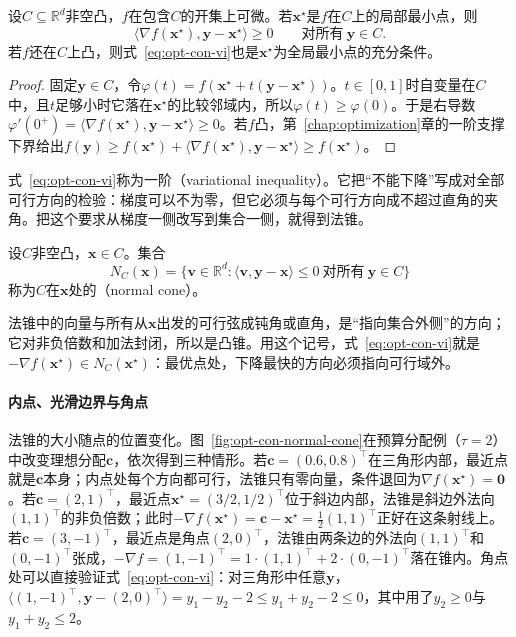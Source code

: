\begin{theorem}[凸可行域上的一阶条件]
\label{thm:opt-con-variational-inequality}
设$C\subseteq\mathbb R^d$非空凸，$f$在包含$C$的开集上可微。若$\bm x^\star$是$f$在$C$上的局部最小点，则
\begin{equation}
\label{eq:opt-con-vi}
  \langle\nabla f(\bm x^\star),\bm y-\bm x^\star\rangle\geq0\qquad\text{对所有}\ \bm y\in C.
\end{equation}
若$f$还在$C$上凸，则式~\eqref{eq:opt-con-vi}也是$\bm x^\star$为全局最小点的充分条件。
\end{theorem}

\begin{proof}
固定$\bm y\in C$，令$\varphi(t)=f(\bm x^\star+t(\bm y-\bm x^\star))$。$t\in[0,1]$时自变量在$C$中，且$t$足够小时它落在$\bm x^\star$的比较邻域内，所以$\varphi(t)\geq\varphi(0)$。于是右导数$\varphi'(0^+)=\langle\nabla f(\bm x^\star),\bm y-\bm x^\star\rangle\geq0$。若$f$凸，第~\ref{chap:optimization}章的一阶支撑下界给出$f(\bm y)\geq f(\bm x^\star)+\langle\nabla f(\bm x^\star),\bm y-\bm x^\star\rangle\geq f(\bm x^\star)$。
\end{proof}

式~\eqref{eq:opt-con-vi}称为一阶（variational inequality）。它把“不能下降”写成对全部可行方向的检验：梯度可以不为零，但它必须与每个可行方向成不超过直角的夹角。把这个要求从梯度一侧改写到集合一侧，就得到法锥。

\begin{definition}[法锥]
\label{def:opt-con-normal-cone}
设$C$非空凸，$\bm x\in C$。集合
\[
  N_C(\bm x)=\{\bm v\in\mathbb R^d:\langle\bm v,\bm y-\bm x\rangle\leq0\ \text{对所有}\ \bm y\in C\}
\]
称为$C$在$\bm x$处的（normal cone）。
\end{definition}

法锥中的向量与所有从$\bm x$出发的可行弦成钝角或直角，是“指向集合外侧”的方向；它对非负倍数和加法封闭，所以是凸锥。用这个记号，式~\eqref{eq:opt-con-vi}就是$-\nabla f(\bm x^\star)\in N_C(\bm x^\star)$：最优点处，下降最快的方向必须指向可行域外。

\paragraph{内点、光滑边界与角点}
法锥的大小随点的位置变化。图~\ref{fig:opt-con-normal-cone}在预算分配例（$\tau=2$）中改变理想分配$\bm c$，依次得到三种情形。若$\bm c=(0.6,0.8)^\top$在三角形内部，最近点就是$\bm c$本身；内点处每个方向都可行，法锥只有零向量，条件退回为$\nabla f(\bm x^\star)=\bm0$。若$\bm c=(2,1)^\top$，最近点$\bm x^\star=(3/2,1/2)^\top$位于斜边内部，法锥是斜边外法向$(1,1)^\top$的非负倍数；此时$-\nabla f(\bm x^\star)=\bm c-\bm x^\star=\frac12(1,1)^\top$正好在这条射线上。若$\bm c=(3,-1)^\top$，最近点是角点$(2,0)^\top$，法锥由两条边的外法向$(1,1)^\top$和$(0,-1)^\top$张成，$-\nabla f=(1,-1)^\top=1\cdot(1,1)^\top+2\cdot(0,-1)^\top$落在锥内。角点处可以直接验证式~\eqref{eq:opt-con-vi}：对三角形中任意$\bm y$，$\langle(1,-1)^\top,\bm y-(2,0)^\top\rangle=y_1-y_2-2\leq y_1+y_2-2\leq0$，其中用了$y_2\geq0$与$y_1+y_2\leq2$。

